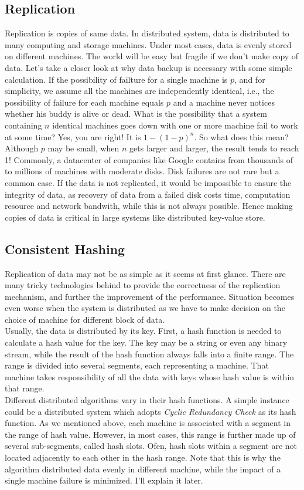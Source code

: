 \documentclass{article}
\begin{document}
\subsection{Replication}
Replication is copies of same data. In distributed system, data is distributed
to many computing and storage machines. Under most cases, data is evenly
stored on different machines. The world will be easy but fragile if we don't
make copy of data. Let's take a closer look at why data backup is necessary
with some simple calculation. If the possibility of failture for a single
machine is $p$, and for simplicity, we assume all the machines are
independently identical, i.e., the possibility of failure for each machine
equals $p$ and a machine never notices whether his buddy is alive or dead.
What is the possibility that a system containing $n$ identical machines goes
down with one or more machine fail to work at some time? Yes, you are right!
It is $1 - (1 - p)^n$. So what does this mean? Although $p$ may be small, when
$n$ gets larger and larger, the result tends to reach 1! Commonly, a
datacenter of companies like Google contains from thousands of to millions of
machines with moderate disks. Disk failures are not rare but a common case. If
the data is not replicated, it would be impossible to ensure the integrity of
data, as recovery of data from a failed disk costs time, computation resource
and network bandwith, while this is not always possible. Hence making copies
of data is critical in large systems like distributed key-value store.\\

\subsection{Consistent Hashing}
Replication of data may not be as simple as it seems at first glance. There
are many tricky technologies behind to provide the correctness of the
replication mechanism, and further the improvement of the performance.
Situation becomes even worse when the system is distributed as we have to make
decision on the choice of machine for different block of data.\\
Usually, the data is distributed by its key. First, a hash function is needed
to calculate a hash value for the key. The key may be a string or even any
binary stream, while the result of the hash function always falls into a
finite range. The range is divided into several segments, each representing a
machine. That machine takes responsibility of all the data with keys whose
hash value is within that range.\\
Different distributed algorithms vary in their hash functions. A simple
instance could be a distributed system which adopts \emph{Cyclic Redundancy
Check} as its hash function. As we mentioned above, each machine is associated
with a segment in the range of hash value. However, in most cases, this range
is further made up of several sub-segments, called hash slots. Ofen, hash
slots within a segment are not located adjacently to each other in the hash
range. Note that this is why the algorithm distributed data evenly in
different machine, while the impact of a single machine failure is minimized.
I'll explain it later.\\
\end{document}
